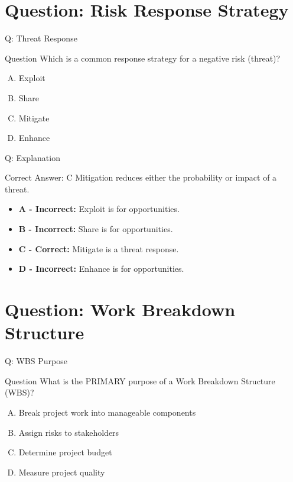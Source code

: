 \documentclass{beamer}
\begin{document}
	\section{Question: Risk Response Strategy}
	
	\begin{frame}{Q: Threat Response}
		\begin{block}{Question}
			Which is a common response strategy for a negative risk (threat)?
		\end{block}
		
		\begin{enumerate}[(A)]
			\item Exploit
			\item Share
			\item Mitigate
			\item Enhance
		\end{enumerate}
	\end{frame}
	
	\begin{frame}{Q: Explanation}
		\begin{block}{Correct Answer: C}
			Mitigation reduces either the probability or impact
			of a threat.
		\end{block}
		
		\begin{itemize}
			\item \textbf{A - Incorrect:} Exploit is for opportunities.
			\item \textbf{B - Incorrect:} Share is for opportunities.
			\item \textbf{C - Correct:} Mitigate is a threat response.
			\item \textbf{D - Incorrect:} Enhance is for opportunities.
		\end{itemize}
	\end{frame}
	
	\section{Question: Work Breakdown Structure}
	
	\begin{frame}{Q: WBS Purpose}
		\begin{block}{Question}
			What is the PRIMARY purpose of a Work Breakdown Structure (WBS)?
		\end{block}
		
		\begin{enumerate}[(A)]
			\item Break project work into manageable components
			\item Assign risks to stakeholders
			\item Determine project budget
			\item Measure project quality
		\end{enumerate}
	\end{frame}
	
\end{document}
